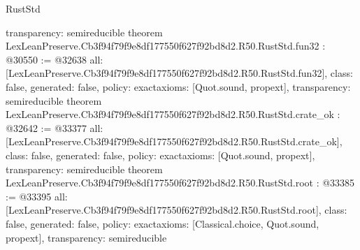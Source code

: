 \begin{lexlean}{RustStd}
\begin{coremodule}
{  transparency: semireducible
}
theorem LexLeanPreserve.Cb3f94f79f9e8df177550f627f92bd8d2.R50.RustStd.fun32 : @30550 := @32638 {
  all: [LexLeanPreserve.Cb3f94f79f9e8df177550f627f92bd8d2.R50.RustStd.fun32],
  class: false,
  generated: false,
  policy: exact{axioms: [Quot.sound, propext]},
  transparency: semireducible
}
theorem LexLeanPreserve.Cb3f94f79f9e8df177550f627f92bd8d2.R50.RustStd.crate_ok : @32642 := @33377 {
  all: [LexLeanPreserve.Cb3f94f79f9e8df177550f627f92bd8d2.R50.RustStd.crate_ok],
  class: false,
  generated: false,
  policy: exact{axioms: [Quot.sound, propext]},
  transparency: semireducible
}
theorem LexLeanPreserve.Cb3f94f79f9e8df177550f627f92bd8d2.R50.RustStd.root : @33385 := @33395 {
  all: [LexLeanPreserve.Cb3f94f79f9e8df177550f627f92bd8d2.R50.RustStd.root],
  class: false,
  generated: false,
  policy: exact{axioms: [Classical.choice, Quot.sound, propext]},
  transparency: semireducible
}


\end{coremodule}
\end{lexlean}
